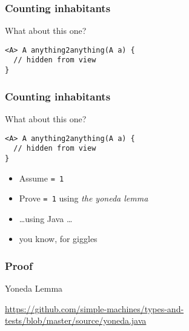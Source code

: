 \begin{frame}[fragile]
\frametitle{Counting inhabitants}
\begin{block}{What about this one?}
\begin{lstlisting}[style=java]
<A> A anything2anything(A a) {
  // hidden from view 
}
\end{lstlisting}
\end{block}
\end{frame}

\begin{frame}[fragile]
\frametitle{Counting inhabitants}
\begin{block}{What about this one?}
\begin{lstlisting}[style=java]
<A> A anything2anything(A a) {
  // hidden from view 
}
\end{lstlisting}
\end{block}
\begin{center}
\begin{itemize}
\item<1-> Assume \lstinline{= 1}
\item<1-> Prove \lstinline{= 1} using \emph{the yoneda lemma}
\item<2-> \ldots using Java \ldots
\item<2-> you know, for giggles
\end{itemize}
\end{center}
\end{frame}

\begin{frame}[fragile]
\frametitle{Proof}
\begin{block}{Yoneda Lemma}
\begin{center}
\href{https://github.com/simple-machines/types-and-tests/blob/master/source/yoneda.java}{https://github.com/simple-machines/types-and-tests/blob/master/source/yoneda.java}
\end{center}
\end{block}
\end{frame}

